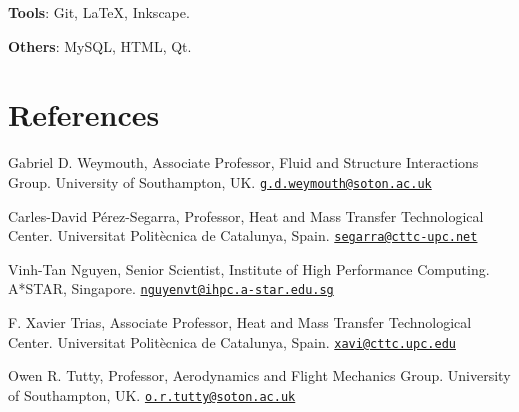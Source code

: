 \documentclass[line]{res}
\newenvironment{p}
  {\begin{adjustwidth}{-10pt}{0pt}}
  {\end{adjustwidth}}
\newenvironment{p1}
  {\begin{adjustwidth}{-16pt}{0pt}
  \vspace{1pt}}
  {\end{adjustwidth}}
\begin{document}
\begin{resume}
\begin{p}
\textbf{Tools}: Git, \LaTeX, Inkscape.

\textbf{Others}: MySQL, HTML, Qt.
\end{p}

\section{References}\vspace{0.2cm}
\begin{p1}\setlength{\parskip}{1em}
Gabriel D. Weymouth, Associate Professor, Fluid and Structure Interactions Group.\newline
University of Southampton, UK.\newline
\href{mailto:g.d.weymouth@soton.ac.uk}{\texttt{g.d.weymouth@soton.ac.uk}}

Carles-David P\'{e}rez-Segarra, Professor, Heat and Mass Transfer Technological Center.\newline
Universitat Polit\`{e}cnica de Catalunya, Spain.\newline
\href{mailto:segarra@cttc-upc.net}{\texttt{segarra@cttc-upc.net}}

Vinh-Tan Nguyen, Senior Scientist, Institute of High Performance Computing.\newline
A*STAR, Singapore.\newline
\href{mailto:nguyenvt@ihpc.a-star.edu.sg}{\texttt{nguyenvt@ihpc.a-star.edu.sg}}

F. Xavier Trias, Associate Professor, Heat and Mass Transfer Technological Center.\newline
Universitat Polit\`{e}cnica de Catalunya, Spain.\newline
\href{mailto:xavi@cttc.upc.edu}{\texttt{xavi@cttc.upc.edu}}

Owen R. Tutty, Professor, Aerodynamics and Flight Mechanics Group.\newline
University of Southampton, UK.\newline
\href{mailto:o.r.tutty@soton.ac.uk}{\texttt{o.r.tutty@soton.ac.uk}}
\end{p1}
\end{resume}
\end{document}
